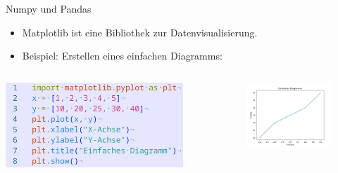 \documentclass[aspectratio=169]{beamer}
\begin{document}
\begin{frame}{Numpy und Pandas}
    \begin{itemize}
        \item Matplotlib ist eine Bibliothek zur Datenvisualisierung.
        \item Beispiel: Erstellen eines einfachen Diagramms:
    \end{itemize}
    \begin{columns}
        \begin{column}{0.5\textwidth}
            \begin{tcolorbox}[colframe=oxfordblue, colback=blue!10, coltitle=white, title=Python]
                \includegraphics[width=0.9\textwidth]{images/code_matplotlibexample.png}
            \end{tcolorbox}
        \end{column}
        \begin{column}{0.5\textwidth}
            \begin{figure}
                \centering
                \includegraphics[width=1\linewidth]{images/graph_matplotlibexample.png}
            \end{figure}
        \end{column}
    \end{columns}
\end{frame}
\end{document}
